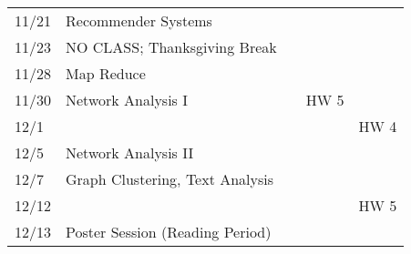 \documentclass[11pt]{article}
\begin{document}
\begin{centering}
\begin{tabular}{||l|p{3in}|l|l|l||}
11/21 & Recommender Systems &  & &\\ 
11/23 & NO CLASS; Thanksgiving Break  & & & \\ 
 \hline

11/28 & Map Reduce &  & & \\ 
11/30 & Network Analysis I &&HW 5 &\\
12/1 &&&& HW 4\\
\hline 

12/5 & Network Analysis II & & & \\ 
12/7 & Graph Clustering, Text Analysis &  &  &\\ 
\hline 
12/12 &&&& HW 5\\
12/13 & Poster Session (Reading Period) &&& \\

\hline\hline


\end{tabular}\\
\end{centering}
\end{document}
